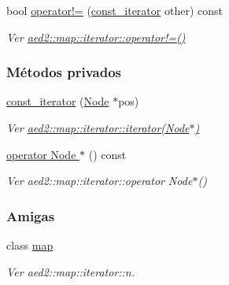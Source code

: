 \begin{DoxyCompactItemize}
bool \hyperlink{classaed2_1_1iterator_1_1const__iterator_aab85ac017cb4e8404fe243691b8c867f_aab85ac017cb4e8404fe243691b8c867f}{operator!=} (\hyperlink{classaed2_1_1iterator_1_1const__iterator}{const\-\_\-iterator} other) const 
\begin{DoxyCompactList}\small\item\em \-Ver \hyperlink{classaed2_1_1map_1_1iterator_a836c7a166d63f507c4f79085ae953c51_a836c7a166d63f507c4f79085ae953c51}{aed2\-::map\-::iterator\-::operator!=()} \end{DoxyCompactList}\end{DoxyCompactItemize}
\subsubsection*{\-Métodos privados}
\begin{DoxyCompactItemize}
\item 
\hyperlink{classaed2_1_1iterator_1_1const__iterator_a8ef6d37dab4cd4ccad630fd0fa6cf28a_a8ef6d37dab4cd4ccad630fd0fa6cf28a}{const\-\_\-iterator} (\hyperlink{structaed2_1_1iterator_1_1Node}{\-Node} $\ast$pos)
\begin{DoxyCompactList}\small\item\em \-Ver \hyperlink{classaed2_1_1map_1_1iterator_ab0ea21abcb32b6d5a72cf341b9029838_ab0ea21abcb32b6d5a72cf341b9029838}{aed2\-::map\-::iterator\-::iterator(\-Node$\ast$)} \end{DoxyCompactList}\item 
\hyperlink{classaed2_1_1iterator_1_1const__iterator_a6ce5576b1b7757fd477ae3d06a7a360e_a6ce5576b1b7757fd477ae3d06a7a360e}{operator Node $\ast$} () const 
\begin{DoxyCompactList}\small\item\em \-Ver aed2\-::map\-::iterator\-::operator \-Node$\ast$() \end{DoxyCompactList}\end{DoxyCompactItemize}
\subsubsection*{\-Amigas}
\begin{DoxyCompactItemize}
\item 
class \hyperlink{classaed2_1_1iterator_1_1const__iterator_aeda338414e516b47761f994fb78056c6_aeda338414e516b47761f994fb78056c6}{map}
\begin{DoxyCompactList}\small\item\em \-Ver aed2\-::map\-::iterator\-::n. \end{DoxyCompactList}\end{DoxyCompactItemize}



